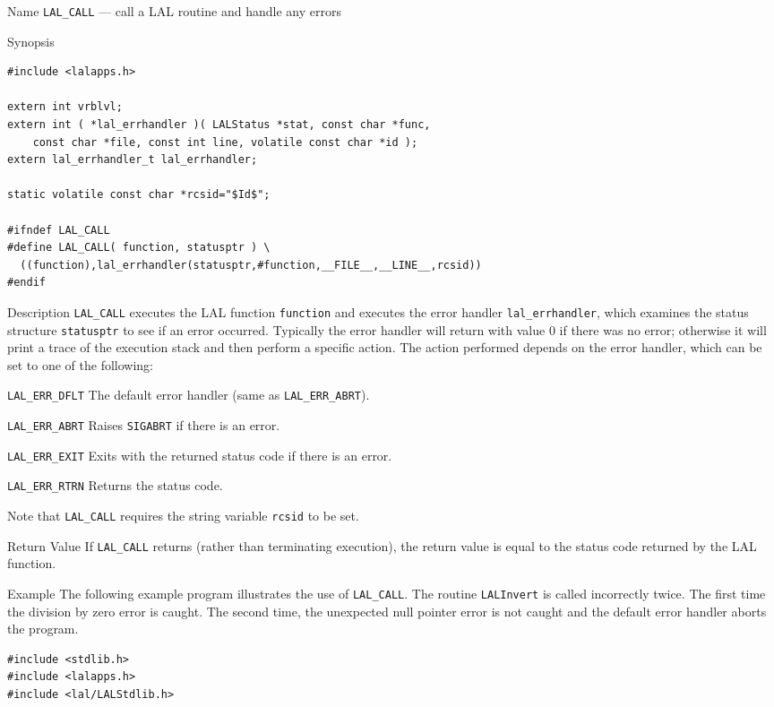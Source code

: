 \documentclass[oneside]{book}
\newenvironment{entry}%
  {\begin{list}{}{\renewcommand{\makelabel}[1]%
    {\parbox[b]{\labelwidth}{\makebox[0pt][l]{\textbf{##1}}\\}}%
    \setlength{\labelwidth}{1em}%
    \setlength{\labelsep}{1em}%
    \setlength{\leftmargin}{2em}%
    \setlength{\topsep}{\medskipamount}%
    \setlength{\itemsep}{\medskipamount}%
    \setlength{\parsep}{\medskipamount}%
    \setlength{\listparindent}{0pt}}}
  {\end{list}}
\newenvironment{indented}%
  {\begin{list}{}{\setlength{\leftmargin}{2em}}%
    \setlength{\itemsep}{\medskipamount}%
    \setlength{\parsep}{\medskipamount}%
    \setlength{\listparindent}{0pt}\item}
  {\end{list}}
\begin{document}
\begin{entry}

\item[Name]
\verb$LAL_CALL$ --- call a LAL routine and handle any errors

\item[Synopsis]
\begin{verbatim}
#include <lalapps.h>

extern int vrblvl;
extern int ( *lal_errhandler )( LALStatus *stat, const char *func,
    const char *file, const int line, volatile const char *id );
extern lal_errhandler_t lal_errhandler;

static volatile const char *rcsid="$Id$";

#ifndef LAL_CALL
#define LAL_CALL( function, statusptr ) \
  ((function),lal_errhandler(statusptr,#function,__FILE__,__LINE__,rcsid))
#endif
\end{verbatim}

\item[Description]
\verb$LAL_CALL$ executes the LAL function \verb$function$ and executes the
error handler \verb$lal_errhandler$, which examines the status structure
\verb$statusptr$ to see if an error occurred.  Typically the error handler
will return with value 0 if there was no error; otherwise it will print a trace
of the execution stack and then perform a specific action.  The action
performed depends on the error handler, which can be set to one of the
following:
\begin{indented}
\begin{entry}
\item[\texttt{LAL\_ERR\_DFLT}]
  The default error handler (same as \verb$LAL_ERR_ABRT$).
\item[\texttt{LAL\_ERR\_ABRT}]
  Raises \verb$SIGABRT$ if there is an error.
\item[\texttt{LAL\_ERR\_EXIT}]
  Exits with the returned status code if there is an error.
\item[\texttt{LAL\_ERR\_RTRN}]
  Returns the status code.
\end{entry}
\end{indented}

Note that \verb$LAL_CALL$ requires the string variable \verb$rcsid$ to be set.

\item[Return Value]
If \verb$LAL_CALL$ returns (rather than terminating execution), the return
value is equal to the status code returned by the LAL function.

\item[Example]
The following example program illustrates the use of \verb$LAL_CALL$.
The routine \verb$LALInvert$ is called incorrectly twice.  The first time
the division by zero error is caught.  The second time, the unexpected null
pointer error is not caught and the default error handler aborts the program.
\begin{indented}
\begin{verbatim}
#include <stdlib.h>
#include <lalapps.h>
#include <lal/LALStdlib.h>


\end{verbatim}
\end{indented}
\end{entry}
\end{document}
